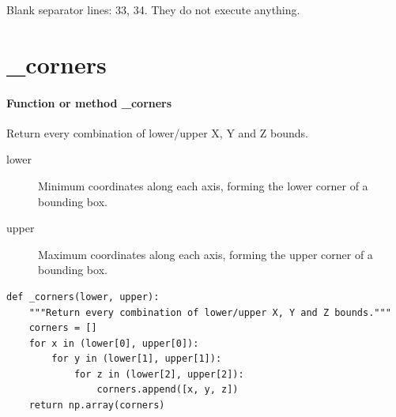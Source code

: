 \documentclass[11pt,a4paper]{book}
\begin{document}
Blank separator lines: 33, 34. They do not execute anything.

\section{\_corners}

\paragraph{Function or method \_corners}
Return every combination of lower/upper X, Y and Z bounds.

\begin{description}
\item[lower] Minimum coordinates along each axis, forming the lower corner of a bounding box.
\item[upper] Maximum coordinates along each axis, forming the upper corner of a bounding box.
\end{description}

\begin{lstlisting}[firstnumber=35]
def _corners(lower, upper):
    """Return every combination of lower/upper X, Y and Z bounds."""
    corners = []
    for x in (lower[0], upper[0]):
        for y in (lower[1], upper[1]):
            for z in (lower[2], upper[2]):
                corners.append([x, y, z])
    return np.array(corners)


\end{lstlisting}
\end{document}
